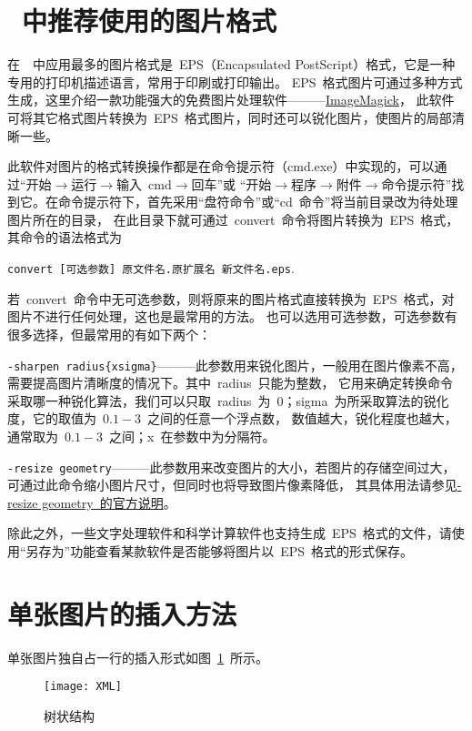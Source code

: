 \section{\XeLaTeX~中推荐使用的图片格式}
在~\XeLaTeX~中应用最多的图片格式是~EPS（Encapsulated PostScript）格式，它是一种专用的打印机描述语言，常用于印刷或打印输出。
EPS~格式图片可通过多种方式生成，这里介绍一款功能强大的免费图片处理软件———\href{http://www.imagemagick.org/}{ImageMagick}，
此软件可将其它格式图片转换为~EPS~格式图片，同时还可以锐化图片，使图片的局部清晰一些。

此软件对图片的格式转换操作都是在命令提示符（cmd.exe）中实现的，可以通过“开始$\to$运行$\to$输入~cmd$\to$回车”或
“开始$\to$程序$\to$附件$\to$命令提示符”找到它。在命令提示符下，首先采用“盘符命令”或“cd~命令”将当前目录改为待处理图片所在的目录，
在此目录下就可通过~convert~命令将图片转换为~EPS~格式，其命令的语法格式为

\indent\verb|convert [可选参数] 原文件名.原扩展名 新文件名.eps|.

若~convert~命令中无可选参数，则将原来的图片格式直接转换为~EPS~格式，对图片不进行任何处理，这也是最常用的方法。
也可以选用可选参数，可选参数有很多选择，但最常用的有如下两个：

\verb|-sharpen radius{xsigma}|———此参数用来锐化图片，一般用在图片像素不高，需要提高图片清晰度的情况下。其中~radius~只能为整数，
它用来确定转换命令采取哪一种锐化算法，我们可以只取~radius~为~0；sigma~为所采取算法的锐化度，它的取值为~$0.1 - 3$~之间的任意一个浮点数，
数值越大，锐化程度也越大，通常取为~$0.1 - 3$~之间；x~在参数中为分隔符。

\verb|-resize geometry|———此参数用来改变图片的大小，若图片的存储空间过大，可通过此命令缩小图片尺寸，但同时也将导致图片像素降低，
其具体用法请参见\href{http://www.imagemagick.org/script/command-line-options.php#resize}{-resize geometry~的官方说明}。

除此之外，一些文字处理软件和科学计算软件也支持生成~EPS~格式的文件，请使用“另存为”功能查看某款软件是否能够将图片以~EPS~格式的形式保存。

\section{单张图片的插入方法}
单张图片独自占一行的插入形式如图~\ref{fig:xml}~所示。
\begin{figure}[htbp]
\centering
\texttt{[image: XML]}
\caption{树状结构}\label{fig:xml}
\vspace{\baselineskip}
\end{figure}


